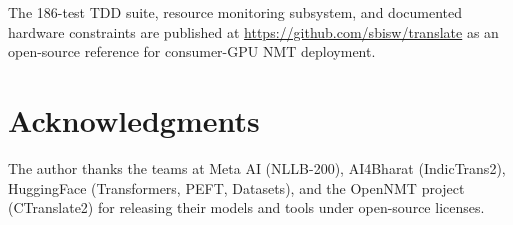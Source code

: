 \documentclass[conference]{IEEEtran}
\begin{document}
The 186-test TDD suite, resource monitoring subsystem, and documented hardware
constraints are published at \url{https://github.com/sbisw/translate} as an
open-source reference for consumer-GPU NMT deployment.

\section*{Acknowledgments}

The author thanks the teams at Meta AI (NLLB-200), AI4Bharat (IndicTrans2),
HuggingFace (Transformers, PEFT, Datasets), and the OpenNMT project (CTranslate2)
for releasing their models and tools under open-source licenses.
\end{document}
